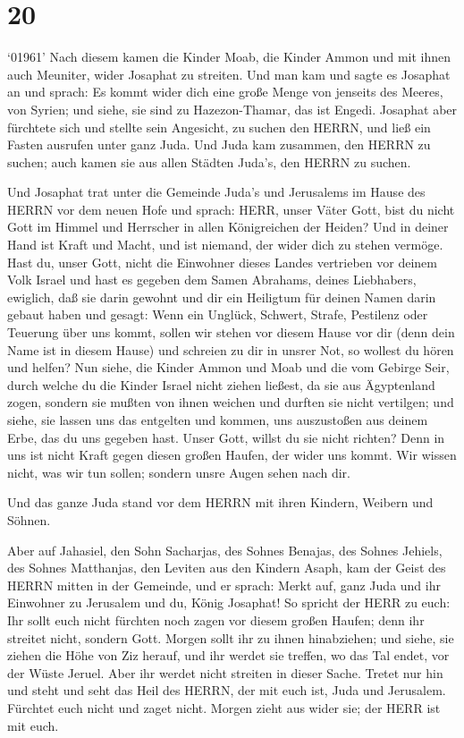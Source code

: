 \hypertarget{section-19}{%
\section{20}\label{section-19}}

 `01961' Nach diesem kamen die Kinder Moab, die Kinder Ammon
und mit ihnen auch Meuniter, wider Josaphat zu streiten. 
Und man kam und sagte es Josaphat an und sprach: Es kommt wider dich
eine große Menge von jenseits des Meeres, von Syrien; und siehe, sie
sind zu Hazezon-Thamar, das ist Engedi.  Josaphat aber
fürchtete sich und stellte sein Angesicht, zu suchen den HERRN, und ließ
ein Fasten ausrufen unter ganz Juda.  Und Juda kam zusammen,
den HERRN zu suchen; auch kamen sie aus allen Städten Juda's, den HERRN
zu suchen.

 Und Josaphat trat unter die Gemeinde Juda's und Jerusalems
im Hause des HERRN vor dem neuen Hofe  und sprach: HERR,
unser Väter Gott, bist du nicht Gott im Himmel und Herrscher in allen
Königreichen der Heiden? Und in deiner Hand ist Kraft und Macht, und ist
niemand, der wider dich zu stehen vermöge.  Hast du, unser
Gott, nicht die Einwohner dieses Landes vertrieben vor deinem Volk
Israel und hast es gegeben dem Samen Abrahams, deines Liebhabers,
ewiglich,  daß sie darin gewohnt und dir ein Heiligtum für
deinen Namen darin gebaut haben und gesagt:  Wenn ein
Unglück, Schwert, Strafe, Pestilenz oder Teuerung über uns kommt, sollen
wir stehen vor diesem Hause vor dir (denn dein Name ist in diesem Hause)
und schreien zu dir in unsrer Not, so wollest du hören und helfen?
 Nun siehe, die Kinder Ammon und Moab und die vom Gebirge
Seir, durch welche du die Kinder Israel nicht ziehen ließest, da sie aus
Ägyptenland zogen, sondern sie mußten von ihnen weichen und durften sie
nicht vertilgen;  und siehe, sie lassen uns das entgelten
und kommen, uns auszustoßen aus deinem Erbe, das du uns gegeben hast.
 Unser Gott, willst du sie nicht richten? Denn in uns ist
nicht Kraft gegen diesen großen Haufen, der wider uns kommt. Wir wissen
nicht, was wir tun sollen; sondern unsre Augen sehen nach dir.

 Und das ganze Juda stand vor dem HERRN mit ihren Kindern,
Weibern und Söhnen.

 Aber auf Jahasiel, den Sohn Sacharjas, des Sohnes Benajas,
des Sohnes Jehiels, des Sohnes Matthanjas, den Leviten aus den Kindern
Asaph, kam der Geist des HERRN mitten in der Gemeinde,  und
er sprach: Merkt auf, ganz Juda und ihr Einwohner zu Jerusalem und du,
König Josaphat! So spricht der HERR zu euch: Ihr sollt euch nicht
fürchten noch zagen vor diesem großen Haufen; denn ihr streitet nicht,
sondern Gott.  Morgen sollt ihr zu ihnen hinabziehen; und
siehe, sie ziehen die Höhe von Ziz herauf, und ihr werdet sie treffen,
wo das Tal endet, vor der Wüste Jeruel.  Aber ihr werdet
nicht streiten in dieser Sache. Tretet nur hin und steht und seht das
Heil des HERRN, der mit euch ist, Juda und Jerusalem. Fürchtet euch
nicht und zaget nicht. Morgen zieht aus wider sie; der HERR ist mit
euch.

